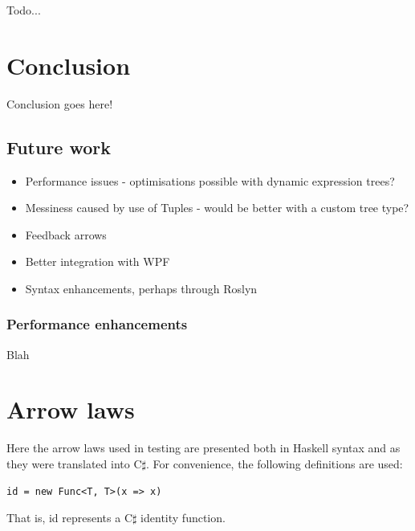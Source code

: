 \documentclass[12pt,twoside,notitlepage]{report}
\begin{document}
Todo...

\cleardoublepage



\chapter{Conclusion}

Conclusion goes here!

\section{Future work}

\begin{itemize}
	\item Performance issues - optimisations possible with dynamic expression trees?
	\item Messiness caused by use of Tuples - would be better with a custom tree type?
	\item Feedback arrows
	\item Better integration with WPF
	\item Syntax enhancements, perhaps through Roslyn
\end{itemize}

\subsection{Performance enhancements} \label{sec:performance_enhancements}

Blah

\cleardoublepage



\appendix

\chapter{Arrow laws} \label{sec:arrow_laws}

Here the arrow laws used in testing are presented both in Haskell syntax and as they were translated into C$\sharp$. For convenience, the following definitions are used:

\begin{lstlisting}
id = new Func<T, T>(x => x)
\end{lstlisting}

That is, id represents a C$\sharp$ identity function.
\end{document}
